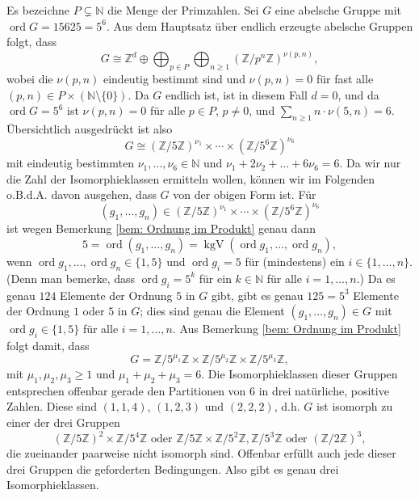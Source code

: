 \documentclass[a4paper,10pt]{article}
\theoremstyle{definition}
\newcommand{\N}{\mathbb{N}}
\newcommand{\Z}{\mathbb{Z}}
\newcommand{\ord}{\operatorname{ord}}
\newcommand{\kgV}{\operatorname{kgV}}
\begin{document}
Es bezeichne $P \subsetneq \N$ die Menge der Primzahlen.
Sei $G$ eine abelsche Gruppe mit $\ord G = 15625 = 5^6$. Aus dem Hauptsatz über endlich erzeugte abelsche Gruppen folgt, dass
\[
 G \cong \Z^d \oplus \bigoplus_{p \in P} \bigoplus_{n \geq 1} (\Z/p^n\Z)^{\nu(p,n)},
\]
wobei die $\nu(p,n)$ eindeutig bestimmt sind und $\nu(p,n) = 0$ für fast alle $(p,n) \in P \times (\N\setminus\{0\})$. Da $G$ endlich ist, ist in diesem Fall $d = 0$, und da $\ord G = 5^6$ ist $\nu(p,n) = 0$ für alle $p \in P$, $p \neq 0$, und $\sum_{n \geq 1} n \cdot \nu(5,n) = 6$. Übersichtlich ausgedrückt ist also
\[
 G \cong (\Z/5\Z)^{\nu_1} \times \cdots \times (\Z/5^6\Z)^{\nu_6}
\]
mit eindeutig bestimmten $\nu_1, \ldots, \nu_6 \in \N$ und $\nu_1 + 2 \nu_2 + \ldots + 6 \nu_6 = 6$. Da wir nur die Zahl der Isomorphieklassen ermitteln wollen, können wir im Folgenden o.B.d.A. davon ausgehen, dass $G$ von der obigen Form ist. Für
\[
 (g_1, \ldots, g_n) \in (\Z/5\Z)^{\nu_1} \times \cdots \times (\Z/5^6\Z)^{\nu_6}
\]
ist wegen Bemerkung \ref{bem: Ordnung im Produkt} genau dann
\[
 5 = \ord (g_1, \ldots, g_n) = \kgV(\ord g_1, \ldots, \ord g_n),
\]
wenn $\ord g_1, \ldots, \ord g_n \in \{1,5\}$ und $\ord g_i = 5$ für (mindestens) ein $i \in \{1, \ldots, n\}$. (Denn man bemerke, dass $\ord g_i = 5^k$ für ein $k \in \N$ für alle $i=1,\ldots,n$.)
Da es genau $124$ Elemente der Ordnung $5$ in $G$ gibt, gibt es genau $125 = 5^3$ Elemente der Ordnung $1$ oder $5$ in $G$; dies sind genau die Element $(g_1, \ldots, g_n) \in G$ mit $\ord g_i \in \{1,5\}$ für alle $i=1,\ldots,n$. Aus Bemerkung \ref{bem: Ordnung im Produkt} folgt damit, dass
\[
 G = \Z/5^{\mu_1}\Z \times \Z/5^{\mu_2}\Z \times \Z/5^{\mu_3}\Z,
\]
mit $\mu_1, \mu_2, \mu_3 \geq 1$ und $\mu_1 + \mu_2 + \mu_3 = 6$. Die Isomorphieklassen dieser Gruppen entsprechen offenbar gerade den Partitionen von $6$ in drei natürliche, positive Zahlen. Diese sind $(1,1,4)$, $(1,2,3)$ und $(2,2,2)$, d.h. $G$ ist isomorph zu einer der drei Gruppen
\[
 (\Z/5\Z)^2 \times \Z/5^4\Z \text{ oder } \Z/5\Z \times \Z/5^2\Z, \Z/5^3\Z \text{ oder } (\Z/2\Z)^3,
\]
die zueinander paarweise nicht isomorph sind. Offenbar erfüllt auch jede dieser drei Gruppen die geforderten Bedingungen. Also gibt es genau drei Isomorphieklassen.
















\addtocounter{section}{1}
\end{document}
